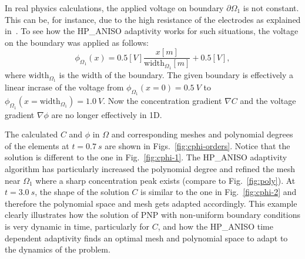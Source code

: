 In real physics calculations, the applied voltage on boundary $\partial\Omega_1$
is not constant. This can be, for instance, due to the high resistance of
the electrodes as explained in~\cite{pugal2009}.
To see how the HP\_ANISO adaptivity works for such situations, the
voltage on the boundary was applied as follows:
\begin{equation}
  \phi_{\Omega_1}\left( x \right)=0.5\left[V \right] \frac{x\left[ m \right ]}{\text{width}_{\Omega_1}\left[ m \right]}+0.5\left[ V \right],
\end{equation}
where $\text{width}_{\Omega_1}$ is the width of the boundary. The given boundary is effectively
a linear incrase of the voltage from $\phi_{\Omega_1}\left(x = 0 \right)=0.5\ V$ to
$\phi_{\Omega_1}\left(x=\text{width}_{\Omega_1}\right) = 1.0\ V$.
Now the concentration gradient $\nabla C$ and the voltage gradient $\nabla \phi$ are no
longer effectively in 1D.

The calculated $C$ and $\phi$ in $\Omega$ and corresponding meshes and polynomial
degrees of the elements at $t=0.7\ s$ are shown in Figs.~\ref{fig:cphi-orders}.
Notice that the solution
is different to the one in Fig.~\ref{fig:cphi-1}. The HP\_ANISO
adaptivity algorithm has particularly increased the polynomial degree
and refined the mesh near $\Omega_1$ where a sharp concentration
peak exists (compare to Fig.~\ref{fig:poly}).
At $t=3.0\ s$, the shape of the solution $C$ is similar to the one
in Fig.~\ref{fig:cphi-2} and therefore the polynomial space and mesh gets adapted
accordingly. This example clearly illustrates how 
the solution of PNP with non-uniform
boundary conditions is very dynamic in time, particularly for $C$,
and how the HP\_ANISO time dependent adaptivity 
finds an optimal mesh and polynomial space to adapt to the dynamics
of the problem. 
